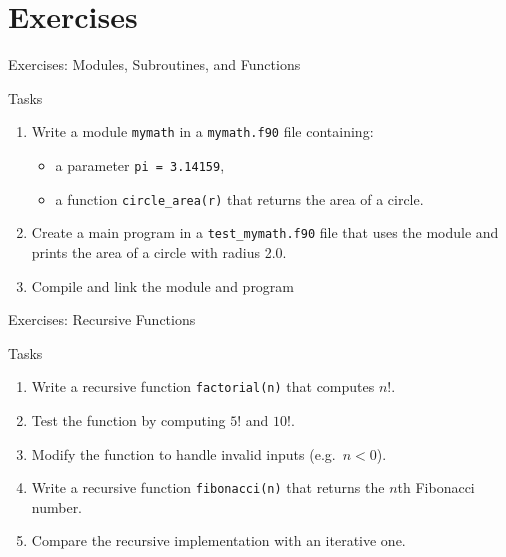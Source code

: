 \section{Exercises}
\begin{frame}{Exercises: Modules, Subroutines, and Functions}
\begin{block}{Tasks}
\begin{enumerate}
\item Write a module \texttt{mymath} in a \texttt{mymath.f90} file containing:
\begin{itemize}
\item a parameter \texttt{pi = 3.14159},
\item a function \texttt{circle\_area(r)} that returns the area of a circle.
\end{itemize}
\item Create a main program in a \texttt{test\_mymath.f90} file that uses the module and prints the area of a circle with radius 2.0.
\item Compile and link the module and program
\end{enumerate}
\end{block}
\end{frame}


\begin{frame}{Exercises: Recursive Functions}
\begin{block}{Tasks}
\begin{enumerate}
\item Write a recursive function \texttt{factorial(n)} that computes $n!$.
\item Test the function by computing $5!$ and $10!$.
\item Modify the function to handle invalid inputs (e.g.\ $n < 0$).
\item Write a recursive function \texttt{fibonacci(n)} that returns the $n$th Fibonacci number.
\item Compare the recursive implementation with an iterative one.
\end{enumerate}
\end{block}
\end{frame}



